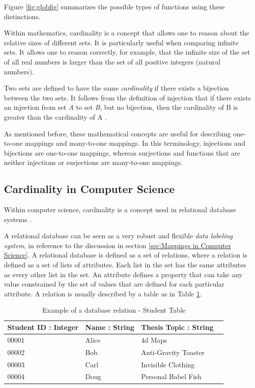 Figure \ref{fig:globfig} summarizes the possible types of functions using these distinctions.

Within mathematics, cardinality is a concept that allows one to reason about the relative sizes of different sets. It is particularly useful when comparing infinite sets. It allows one to reason correctly, for example, that the infinite size of the set of all real numbers is larger than the set of all positive integers (natural numbers).

Two sets are defined to have the same \emph{cardinality} if there exists a bijection between the two sets. It follows from the definition of injection that if there exists an injection from set \emph{A} to set \emph{B}, but no bijection, then the cardinality of B is greater than the cardinality of A \cite{cardmath2010}.

As mentioned before, these mathematical concepts are useful for describing one-to-one mappings and many-to-one mappings. In this terminology, injections and bijections are one-to-one mappings, whereas surjections and functions that are neither injections or surjections are many-to-one mappings.

\subsection{Cardinality in Computer Science}

Within computer science, cardinality is a concept used in relational database systems \cite{carddata1987}. 

A relational database can be seen as a very robust and flexible \emph{data labeling system}, in reference to the discussion in section \ref{sec:Mappings in Computer Science}. A relational database is defined as a set of relations, where a relation is defined as a set of lists of attributes. Each list in the set has the same attributes as every other list in the set. An attribute defines a property that can take any value constrained by the set of values that are defined for each particular attribute. A relation is usually described by a table as in Table \ref{tab:studentrelation}.

\begin{table}
    \begin{center}
    \begin{tabular}{ | l | l | l | l | }
    \hline
    Student ID : Integer & Name : String & Thesis Topic : String \\ \hline
    00001 & Alice & 4d Maps \\ \hline
    00002 & Bob &  Anti-Gravity Toaster \\ \hline
    00003 & Carl & Invisible Clothing \\ \hline
    00004 & Doug & Personal Babel Fish \\
    \hline
    \end{tabular}
    \end{center}
    \caption{Example of a database relation - Student Table}
    \label{tab:studentrelation}
\end{table}

